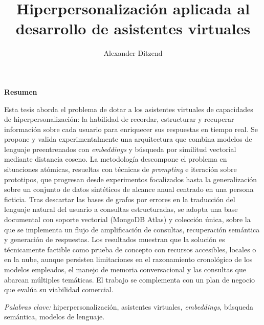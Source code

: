 \documentclass[stu,spanish,a4paper]{apa7}
\title{Hiperpersonalización aplicada al desarrollo de asistentes virtuales}
\author{Alexander Ditzend}
\affiliation{Universidad de Buenos Aires}
\begin{document}
	
	\clearpage

	\begin{center}\textbf{\large Resumen}\end{center}
	\vspace{1em}
	\noindent Esta tesis aborda el problema de dotar a los asistentes virtuales de capacidades de hiperpersonalización: la habilidad de recordar, estructurar y recuperar información sobre cada usuario para enriquecer sus respuestas en tiempo real. Se propone y valida experimentalmente una arquitectura que combina modelos de lenguaje preentrenados con \textit{embeddings} y búsqueda por similitud vectorial mediante distancia coseno. La metodología descompone el problema en situaciones atómicas, resueltas con técnicas de \textit{prompting} e iteración sobre prototipos, que progresan desde experimentos focalizados hasta la generalización sobre un conjunto de datos sintéticos de alcance anual centrado en una persona ficticia. Tras descartar las bases de grafos por errores en la traducción del lenguaje natural del usuario a consultas estructuradas, se adopta una base documental con soporte vectorial (MongoDB Atlas) y colección única, sobre la que se implementa un flujo de amplificación de consultas, recuperación semántica y generación de respuestas. Los resultados muestran que la solución es técnicamente factible como prueba de concepto con recursos accesibles, locales o en la nube, aunque persisten limitaciones en el razonamiento cronológico de los modelos empleados, el manejo de memoria conversacional y las consultas que abarcan múltiples temáticas. El trabajo se complementa con un plan de negocio que evalúa su viabilidad comercial.

	\vspace{1em}\noindent\textit{Palabras clave:} hiperpersonalización, asistentes virtuales, \textit{embeddings}, búsqueda semántica, modelos de lenguaje.
	\clearpage

	\tableofcontents
	\newpage

	
	
	
	 
	 
	 
	 
	 	
	 	
	 
	 
	 
	 
	 
	 
	 
	 
	 
	 
	 
	 
	 
	 
	 
	 
	 
	 
	 
	 
	
	\appendix
	
	
	
	
	
	
	
	
	
	

	
	

	\nocite{*}
	\printbibliography[category=cited,title={Referencias},heading=bibintoc]
	\printbibliography[notcategory=cited,title={Bibliografía consultada},heading=bibintoc]
\end{document}
